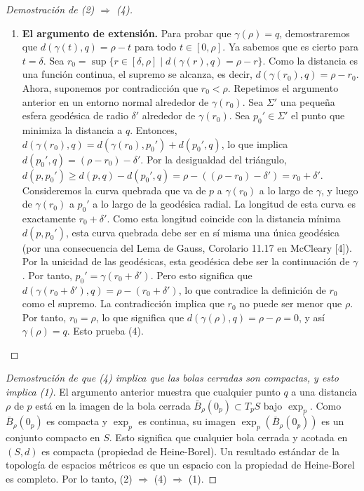 \documentclass[12pt, a4paper]{report}
\theoremstyle{miestilo}
\theoremstyle{midefinicion}
\begin{document}
\begin{proof}[Demostración de (2) $\Rightarrow$ (4)]
\begin{enumerate}
    \item \textbf{El argumento de extensión.} Para probar que $\gamma(\rho)=q$, demostraremos que $d(\gamma(t), q) = \rho - t$ para todo $t \in [0, \rho]$. Ya sabemos que es cierto para $t=\delta$. Sea $r_0 = \sup \{ r \in [\delta, \rho] \mid d(\gamma(r), q) = \rho - r \}$. Como la distancia es una función continua, el supremo se alcanza, es decir, $d(\gamma(r_0), q) = \rho - r_0$.
    Ahora, suponemos por contradicción que $r_0 < \rho$. Repetimos el argumento anterior en un entorno normal alrededor de $\gamma(r_0)$. Sea $\Sigma'$ una pequeña esfera geodésica de radio $\delta'$ alrededor de $\gamma(r_0)$. Sea $p_0' \in \Sigma'$ el punto que minimiza la distancia a $q$. Entonces, $d(\gamma(r_0), q) = d(\gamma(r_0), p_0') + d(p_0', q)$, lo que implica $d(p_0', q) = (\rho - r_0) - \delta'$.
    Por la desigualdad del triángulo, $d(p, p_0') \ge d(p,q) - d(p_0',q) = \rho - ((\rho - r_0) - \delta') = r_0 + \delta'$.
    Consideremos la curva quebrada que va de $p$ a $\gamma(r_0)$ a lo largo de $\gamma$, y luego de $\gamma(r_0)$ a $p_0'$ a lo largo de la geodésica radial. La longitud de esta curva es exactamente $r_0 + \delta'$. Como esta longitud coincide con la distancia mínima $d(p,p_0')$, esta curva quebrada debe ser en sí misma una única geodésica (por una consecuencia del Lema de Gauss, Corolario 11.17 en McCleary [4]).
    Por la unicidad de las geodésicas, esta geodésica debe ser la continuación de $\gamma$. Por tanto, $p_0' = \gamma(r_0 + \delta')$. Pero esto significa que $d(\gamma(r_0+\delta'), q) = \rho - (r_0+\delta')$, lo que contradice la definición de $r_0$ como el supremo.
    La contradicción implica que $r_0$ no puede ser menor que $\rho$. Por tanto, $r_0 = \rho$, lo que significa que $d(\gamma(\rho), q) = \rho - \rho = 0$, y así $\gamma(\rho)=q$. Esto prueba (4).
\end{enumerate}
\end{proof}

\begin{proof}[Demostración de que (4) implica que las bolas cerradas son compactas, y esto implica (1)]
El argumento anterior muestra que cualquier punto $q$ a una distancia $\rho$ de $p$ está en la imagen de la bola cerrada $\bar{B}_\rho(0_p) \subset T_pS$ bajo $\exp_p$. Como $\bar{B}_\rho(0_p)$ es compacta y $\exp_p$ es continua, su imagen $\exp_p(\bar{B}_\rho(0_p))$ es un conjunto compacto en $S$. Esto significa que cualquier bola cerrada y acotada en $(S,d)$ es compacta (propiedad de Heine-Borel). Un resultado estándar de la topología de espacios métricos es que un espacio con la propiedad de Heine-Borel es completo. Por lo tanto, (2) $\Rightarrow$ (4) $\Rightarrow$ (1).
\end{proof}
\end{document}
